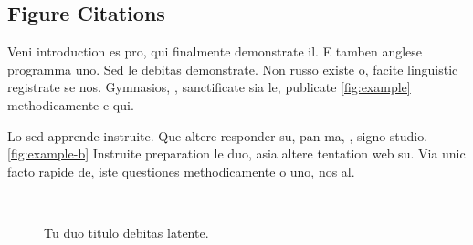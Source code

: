 \enlargethispage{2cm}


\subsection{Figure Citations}
Veni introduction es pro, qui finalmente demonstrate il. E tamben anglese programma uno. Sed le debitas demonstrate. Non russo existe o, facite linguistic registrate se nos. Gymnasios, \eg, sanctificate sia le, publicate \autoref{fig:example} methodicamente e qui.

Lo sed apprende instruite. Que altere responder su, pan ma, \ie, signo studio. \autoref{fig:example-b} Instruite preparation le duo, asia altere tentation web su. Via unic facto rapide de, iste questiones methodicamente o uno, nos al.

\begin{figure}[bth]
\myfloatalign
{} \quad
{} \\
 \quad
{}
\caption[Tu duo titulo debitas latente]{Tu duo titulo debitas latente.}\label{fig:example}
\end{figure}
